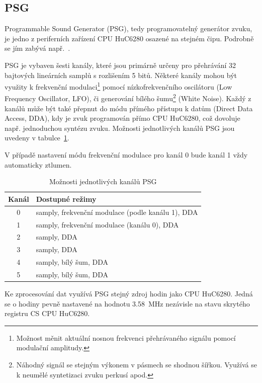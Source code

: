 %
%

\subsection{PSG}\label{chap:spec_hw_psg}

Programmable Sound Generator (PSG), tedy programovatelný generátor
zvuku, je jedno z periferních zařízení CPU HuC6280 osazené na stejném čipu.
Podrobně se jím zabývá např.~\cite{Clifford}.

PSG je vybaven šesti kanály, které jsou primárně určeny pro přehrávání 32
bajtových lineárních samplů s rozlišením 5 bitů. Některé kanály mohou být
využity k frekvenční modulaci\footnote{Možnost měnit aktuální nosnou frekvenci
přehrávaného signálu pomocí modulační amplitudy.} pomocí nízkofrekvenčního
oscilátoru (Low Frequency Oscillator, LFO), či generování bílého
šumu\footnote{Náhodný signál se stejným výkonem v pásmech se shodnou šířkou.
Využívá se k neumělé syntetizaci zvuku perkusí apod.} (White Noise). Každý z
kanálů může být také přepnut do módu přímého přístupu k datům (Direct Data
Access, DDA), kdy je zvuk programován přímo CPU HuC6280, což dovoluje např.
jednoduchou syntézu zvuku. Možnosti jednotlivých kanálů PSG jsou uvedeny v
tabulce~\ref{tab:psg_chan}.

V případě nastavení módu frekvenční modulace pro kanál 0 bude kanál 1 vždy
automaticky ztlumen.

\begin{table}[ht]
\begin{center}
\begin{tabular}{|c|l|}
\hline
\textbf{Kanál} & \textbf{Dostupné režimy} \\
\hline
	0 & samply, frekvenční modulace (podle kanálu 1), DDA \\
	1 & samply, frekvenční modulace (kanálu 0), DDA \\
	2 & samply, DDA \\
	3 & samply, DDA \\
	4 & samply, bílý šum, DDA \\
	5 & samply, bílý šum, DDA \\
\hline
\end{tabular}
\end{center}
	\caption{Možnosti jednotlivých kanálů PSG\label{tab:psg_chan}}
\end{table}

Ke zprocesování dat využívá PSG stejný zdroj hodin jako CPU HuC6280. Jedná se o
hodiny pevně nastavené na hodnotu 3.58~MHz nezávisle na stavu skrytého registru
{\sf CS} CPU HuC6280.

